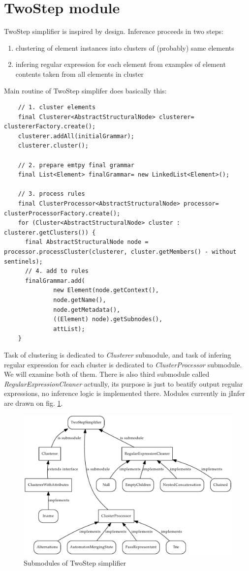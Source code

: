 \documentclass[a4paper,10pt,oneside]{article}
\newcommand{\myscale}{0.74}
\newcommand{\jmodule}[1]{\emph{#1}}
\begin{document}
\section{TwoStep module}
TwoStep simplifier is inspired by \cite{1802522} design. Inference proceeds in two steps:
\begin{enumerate}
	\item clustering of element instances into clusters of (probably) same elements
	\item infering regular expression for each element from examples of element contents taken from all elements in cluster
\end{enumerate}
Main routine of TwoStep simplifer does basically this:
\begin{verbatim}
    // 1. cluster elements
    final Clusterer<AbstractStructuralNode> clusterer= clustererFactory.create();
    clusterer.addAll(initialGrammar);
    clusterer.cluster();

    // 2. prepare emtpy final grammar
    final List<Element> finalGrammar= new LinkedList<Element>();

    // 3. process rules
    final ClusterProcessor<AbstractStructuralNode> processor= clusterProcessorFactory.create();
    for (Cluster<AbstractStructuralNode> cluster : clusterer.getClusters()) {
      final AbstractStructuralNode node =  processor.processCluster(clusterer, cluster.getMembers() - without sentinels);
      // 4. add to rules
      finalGrammar.add(
              new Element(node.getContext(),
              node.getName(),
              node.getMetadata(),
              ((Element) node).getSubnodes(),
              attList);
    }
\end{verbatim}
Task of clustering is dedicated to \jmodule{Clusterer} submodule, and task of infering regular expression for each cluster is dedicated to \jmodule{ClusterProcessor} submodule. We will examine both of them.
There is also third submodule called \jmodule{RegularExpressionCleaner} actually, its purpose is just to beatify output regular expressions, no inference logic is implemented there. 
Modules currently in jInfer are drawn on fig. \ref{twostep_modules}.
\begin{figure}
	\centering\includegraphics[scale=\myscale]{twostep_modules}
	\caption{Submodules of TwoStep simplifier} \label{twostep_modules}
\end{figure}
\end{document}
